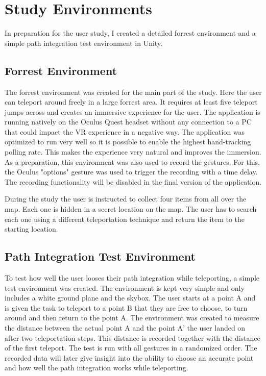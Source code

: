
\chapter{Study Environments}
In preparation for the user study, I created a detailed forrest environment and a simple path integration test environment in Unity.



\section{Forrest Environment}

The forrest environment was created for the main part of the study. Here the user can teleport around freely in a large forrest area. It requires at least five teleport jumps across and creates an immersive experience for the user. The application is running natively on the Oculus Quest headset without any connection to a PC that could impact the VR experience in a negative way. The application was optimized to run very well so it is possible to enable the highest hand-tracking polling rate. This makes the experience very natural and improves the immersion. As a preparation, this environment was also used to record the gestures. For this, the Oculus "options" gesture was used to trigger the recording with a time delay. The recording functionality will be disabled in the final version of the application. %

During the study the user is instructed to collect four items from all over the map. Each one is hidden in a secret location on the map. The user has to search each one using a different teleportation technique and return the item to the starting location. 


\section{Path Integration Test Environment} %
To test how well the user looses their path integration while teleporting, a simple test environment was created. The environment is kept very simple and only includes a white ground plane and the skybox. The user starts at a point A and is given the task to teleport to a point B that they are free to choose, to turn around and then return to the point A. The environment was created to measure the distance between the actual point A and the point A' the user landed on after two teleportation steps. This distance is recorded together with the distance of the first teleport. The test is run with all gestures in a randomized order. The recorded data will later give insight into the ability to choose an accurate point and how well the path integration works while teleporting.